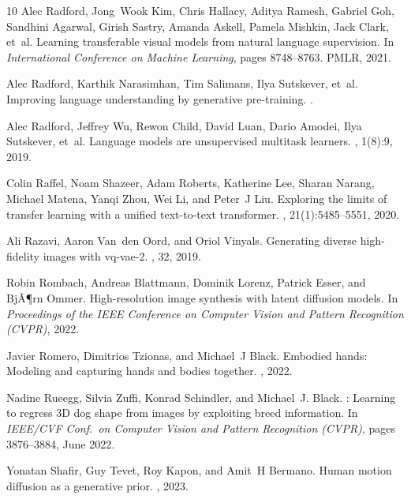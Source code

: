 \documentclass{article}
\begin{document}
{\begin{thebibliography}{10}
  Alec Radford, Jong~Wook Kim, Chris Hallacy, Aditya Ramesh, Gabriel Goh,
    Sandhini Agarwal, Girish Sastry, Amanda Askell, Pamela Mishkin, Jack Clark,
    et~al.
  \newblock Learning transferable visual models from natural language
    supervision.
  \newblock In {\em International Conference on Machine Learning}, pages
    8748--8763. PMLR, 2021.
  
  Alec Radford, Karthik Narasimhan, Tim Salimans, Ilya Sutskever, et~al.
  \newblock Improving language understanding by generative pre-training.
  .
  
  Alec Radford, Jeffrey Wu, Rewon Child, David Luan, Dario Amodei, Ilya
    Sutskever, et~al.
  \newblock Language models are unsupervised multitask learners.
  , 1(8):9, 2019.
  
  Colin Raffel, Noam Shazeer, Adam Roberts, Katherine Lee, Sharan Narang, Michael
    Matena, Yanqi Zhou, Wei Li, and Peter~J Liu.
  \newblock Exploring the limits of transfer learning with a unified text-to-text
    transformer.
  , 21(1):5485--5551,
    2020.
  
  Ali Razavi, Aaron Van~den Oord, and Oriol Vinyals.
  \newblock Generating diverse high-fidelity images with vq-vae-2.
  , 32, 2019.
  
  Robin Rombach, Andreas Blattmann, Dominik Lorenz, Patrick Esser, and BjÃ¶rn
    Ommer.
  \newblock High-resolution image synthesis with latent diffusion models.
  \newblock In {\em Proceedings of the IEEE Conference on Computer Vision and
    Pattern Recognition (CVPR)}, 2022.
  
  Javier Romero, Dimitrios Tzionas, and Michael~J Black.
  \newblock Embodied hands: Modeling and capturing hands and bodies together.
  , 2022.
  
  Nadine Rueegg, Silvia Zuffi, Konrad Schindler, and Michael~J. Black.
  : Learning to regress {3D} dog shape from images by exploiting
    breed information.
  \newblock In {\em IEEE/CVF Conf.~on Computer Vision and Pattern Recognition
    (CVPR)}, pages 3876--3884, June 2022.
  
  Yonatan Shafir, Guy Tevet, Roy Kapon, and Amit~H Bermano.
  \newblock Human motion diffusion as a generative prior.
  , 2023.
  

\end{thebibliography}}
\end{document}
